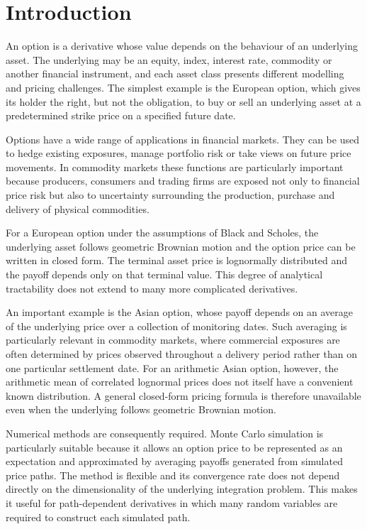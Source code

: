\documentclass[12pt,a4paper]{report}
\begin{document}
\chapter{Introduction}

An option is a derivative whose value depends on the behaviour of an underlying asset. The underlying may be an equity, index, interest rate, commodity or another financial instrument, and each asset class presents different modelling and pricing challenges. The simplest example is the European option, which gives its holder the right, but not the obligation, to buy or sell an underlying asset at a predetermined strike price on a specified future date.

Options have a wide range of applications in financial markets. They can be used to hedge existing exposures, manage portfolio risk or take views on future price movements. In commodity markets these functions are particularly important because producers, consumers and trading firms are exposed not only to financial price risk but also to uncertainty surrounding the production, purchase and delivery of physical commodities.

For a European option under the assumptions of Black and Scholes, the underlying asset follows geometric Brownian motion and the option price can be written in closed form. The terminal asset price is lognormally distributed and the payoff depends only on that terminal value. This degree of analytical tractability does not extend to many more complicated derivatives.

An important example is the Asian option, whose payoff depends on an average of the underlying price over a collection of monitoring dates. Such averaging is particularly relevant in commodity markets, where commercial exposures are often determined by prices observed throughout a delivery period rather than on one particular settlement date. For an arithmetic Asian option, however, the arithmetic mean of correlated lognormal prices does not itself have a convenient known distribution. A general closed-form pricing formula is therefore unavailable even when the underlying follows geometric Brownian motion.

Numerical methods are consequently required. Monte Carlo simulation is particularly suitable because it allows an option price to be represented as an expectation and approximated by averaging payoffs generated from simulated price paths. The method is flexible and its convergence rate does not depend directly on the dimensionality of the underlying integration problem. This makes it useful for path-dependent derivatives in which many random variables are required to construct each simulated path.
\end{document}
